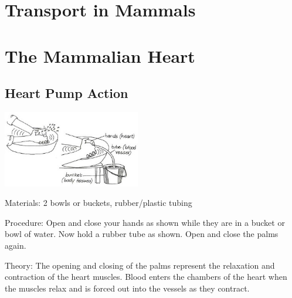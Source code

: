 \begin{multicols}{2}

\section*{Transport in Mammals}


\section*{The Mammalian Heart}


\subsection{Heart Pump Action} %

\begin{center}
\includegraphics[width=0.45\textwidth]{./img/vso/heart-pump.jpg}
\end{center}

\begin{description*}
\item[Materials:]{2 bowls or buckets, rubber/plastic tubing}
\item[Procedure:]{Open and close your hands as
shown while they are in a bucket
or bowl of water. Now hold a
rubber tube as shown. Open and
close the palms again. }
\item[Theory:]{The opening and closing of the palms represent the relaxation and contraction of the heart
muscles. Blood enters the chambers of the heart when the muscles relax and is forced out
into the vessels as they contract.}
\end{description*}


\end{multicols}
